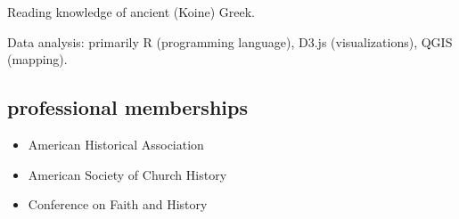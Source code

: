 \documentclass[11pt]{article}
\providecommand{\tightlist}{%
  \setlength{\itemsep}{0pt}\setlength{\parskip}{0pt}}
\begin{document}
Reading knowledge of ancient (Koine) Greek.

Data analysis: primarily R (programming language), D3.js (visualizations), QGIS
(mapping).

\subsection{professional memberships}\label{professional-memberships}

\begin{itemize}
    \tightlist
  \item
    American Historical Association
  \item
    American Society of Church History
  \item
    Conference on Faith and History
\end{itemize}
\end{document}
